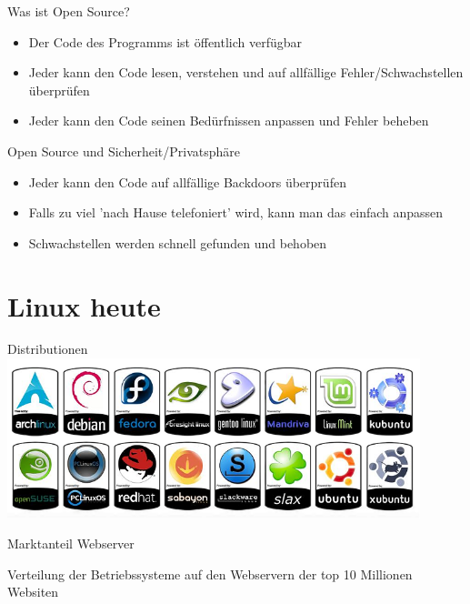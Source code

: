 \documentclass[10pt]{beamer}
\begin{document}
\begin{frame}{Was ist Open Source?}
	\begin{itemize}[<+- | alert@+>]
		\item Der Code des Programms ist öffentlich verfügbar
		\item Jeder kann den Code lesen, verstehen und auf allfällige Fehler/Schwachstellen überprüfen
		\item Jeder kann den Code seinen Bedürfnissen anpassen und Fehler beheben
	\end{itemize}
\end{frame}

\begin{frame}{Open Source und Sicherheit/Privatsphäre}
	\begin{itemize}[<+- | alert@+>]
		\item Jeder kann den Code auf allfällige Backdoors überprüfen
		\item Falls zu viel 'nach Hause telefoniert' wird, kann man das einfach anpassen
		\item Schwachstellen werden schnell gefunden und behoben
	\end{itemize}
\end{frame}

\section{Linux heute}

\begin{frame}{Distributionen}
    \centering
    \includegraphics[keepaspectratio,width=0.9\textwidth]{img/logos_2.png}
\end{frame}

\begin{frame}{Marktanteil Webserver}
    \begin{centering}
	\begin{bchart}[step=10,max=100]
			\smallskip
	\end{bchart}
\end{centering}
    
    Verteilung der Betriebssysteme auf den Webservern der top 10 Millionen Websiten
\end{frame}
\end{document}
